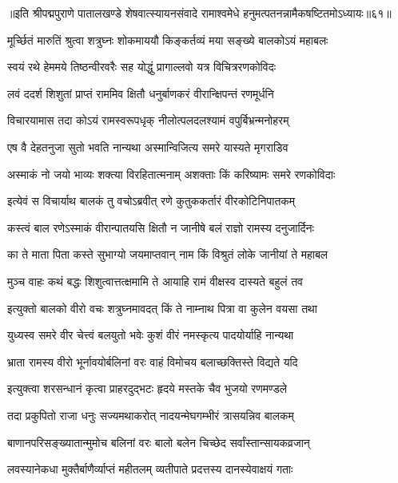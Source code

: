{॥इति श्रीपद्मपुराणे पातालखण्डे शेषवात्स्यायनसंवादे रामाश्वमेधे हनुमत्पतनन्नामैकषष्टितमोऽध्यायः॥६१॥}



\twolineshloka
{मूर्च्छितं मारुतिं श्रुत्वा शत्रुघ्नः शोकमाययौ}
{किङ्कर्तव्यं मया सङ्ख्ये बालकोऽयं महाबलः}%

\twolineshloka
{स्वयं रथे हेममये तिष्ठन्वीरवरैः सह}
{योद्धुं प्रागाल्लवो यत्र विचित्ररणकोविदः}%

\twolineshloka
{लवं ददर्श शिशुतां प्राप्तं राममिव क्षितौ}
{धनुर्बाणकरं वीरान्क्षिपन्तं रणमूर्धनि}%

\twolineshloka
{विचारयामास तदा कोऽयं रामस्वरूपधृक्}
{नीलोत्पलदलश्यामं वपुर्बिभ्रन्मनोहरम्}%

\twolineshloka
{एष वै देहतनुजा सुतो भवति नान्यथा}
{अस्मान्विजित्य समरे यास्यते मृगराडिव}%

\twolineshloka
{अस्माकं नो जयो भाव्यः शक्त्या विरहितात्मनाम्}
{अशक्ताः किं करिष्यामः समरे रणकोविदाः}%

\twolineshloka
{इत्येवं स विचार्याथ बालकं तु वचोऽब्रवीत्}
{रणे कुतुककर्तारं वीरकोटिनिपातकम्}%

\twolineshloka
{कस्त्वं बाल रणेऽस्माकं वीरान्पातयसि क्षितौ}
{न जानीषे बलं राज्ञो रामस्य दनुजार्दिनः}%

\twolineshloka
{का ते माता पिता कस्ते सुभाग्यो जयमाप्तवान्}
{नाम किं विश्रुतं लोके जानीयां ते महाबल}%

\twolineshloka
{मुञ्च वाहः कथं बद्धः शिशुत्वात्तत्क्षमामि ते}
{आयाहि रामं वीक्षस्व दास्यते बहुलं तव}%

\twolineshloka
{इत्युक्तो बालको वीरो वचः शत्रुघ्नमावदत्}
{किं ते नाम्नाथ पित्रा वा कुलेन वयसा तथा}%

\twolineshloka
{युध्यस्व समरे वीर चेत्त्वं बलयुतो भवेः}
{कुशं वीरं नमस्कृत्य पादयोर्याहि नान्यथा}%

\twolineshloka
{भ्राता रामस्य वीरो भूर्नावयोर्बलिनां वरः}
{वाहं विमोचय बलाच्छक्तिस्ते विद्यते यदि}%

\twolineshloka
{इत्युक्त्वा शरसन्धानं कृत्वा प्राहरदुद्भटः}
{हृदये मस्तके चैव भुजयो रणमण्डले}%

\twolineshloka
{तदा प्रकुपितो राजा धनुः सज्यमथाकरोत्}
{नादयन्मेघगम्भीरं त्रासयन्निव बालकम्}%

\twolineshloka
{बाणानपरिसङ्ख्यातान्मुमोच बलिनां वरः}
{बालो बलेन चिच्छेद सर्वांस्तान्सायकव्रजान्}%

\twolineshloka
{लवस्यानेकधा मुक्तैर्बाणैर्व्याप्तं महीतलम्}
{व्यतीपाते प्रदत्तस्य दानस्येवाक्षयं गताः}%

